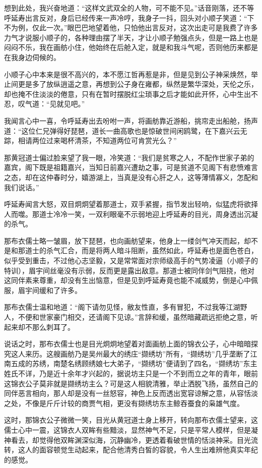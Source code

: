 想到此处，我兴奋地道：“这样文武双全的人物，可不能不见。”话音刚落，还不等呼延寿出言反对，身后已经传来一声冷哼，我身子一抖，回头对小顺子笑道：“下不为例，仅此一次。”眼巴巴地望着他，只怕他出言反对，这次出走可是我费了许多力气才说服小顺子的，各种理由摆了半天，才让小顺子勉强点头，但是一路上也是闷闷不乐，我在画舫小住，他始终在后舱入定，就是和我斗气呢，否则他历来都是在我身边伺候的。

小顺子心中本来是很不高兴的，本不愿江哲再惹是非，但是见到公子神采焕然，举止间更是多了放纵逍遥之意，再想到公子身在雍都，纵然是繁华深处，天伦之乐，却也掩不住淡淡的倦意，只有在暂时摆脱红尘琐事之后才能如此开怀，心中生出不忍，叹气道：“见就见吧。”

我闻言心中一喜，令呼延寿出去吩咐一声，将画舫靠近游船，挑帘走出船舱，扬声道：“这位仁兄弹得好琵琶，道长一曲高歌也是惊破世间闲鸥鹭，在下嘉兴云无踪，相请两位过来喝杯清茶，不知道两位可肯赏光么？”

那黄冠道士偏过脸来望了我一眼，冷笑道：“我们是贫寒之人，不配作世家子弟的嘉宾，阁下既是祖籍嘉兴，当知日前嘉兴遭劫之事，可是贫道不见阁下有悲愤难言之态，却在这仲春时分，嬉游湖上，当真是没有心肝之人，这等薄情寡义，怎配和我们说话。”

呼延寿闻言大怒，双目炯炯望着那道士，双手紧握，指节发出轻响，似猛虎将欲择人而噬。那道士冷冷一笑，一双利眼毫不示弱地迎上呼延寿的目光，周身透出沉凝的杀气。

那布衣儒士略一皱眉，放下琵琶，也向画舫望来，他身上一缕剑气冲天而起，却不是和那道士的杀气汇合，而是将两人暗斗阻断，虽然如此，呼延寿也是面色苍白，似乎受到重击，不过他心志坚毅，又是常常面对宗师级高手的气势凌逼（小顺子的特训），眉宇间丝毫没有示弱，反而更是露出敌意。那道士被同伴剑气阻挠，他对这同伴素来尊重，却没有生出恼意，但是见到呼延寿竟也能不减威势，倒是心中佩服，眉宇间缓和了许多。

那布衣儒士温和地道：“阁下请勿见怪，敝友性直，多有冒犯，不过我等江湖野人，不便和世家豪门相交，还请阁下见谅。”言辞和缓，虽然暗藏疏远拒绝之意，听起来却不那么刺耳了。

说话之时，那布衣儒士也是目光炯炯地望着对面画舫上面的锦衣公子，心中暗暗探究这人来历。这艘画舫乃是吴州最大的绣庄“撷绣坊”所有，“撷绣坊”几乎垄断了江南五成的苏绣，南楚名绣顾绣娘七大弟子，“撷绣坊”便请到了四名，“撷绣坊”东主姓氏不详，乃是近十余年才兴起的，据说坊主只是一个不到而立之年的青年，眼前这锦衣公子莫非就是撷绣坊主么？可是这人相貌清雅，举止洒脱飞扬，虽然自己的同伴恶言相向，那人却是没有一丝怒容，神色上反而透出宽容谅解之意，从容恬淡之处，不像是斤斤计较的商贾气相，更没有撷绣坊东主鲸吞蚕食的枭雄气度。

这时，那锦衣公子微微一笑，目光从黄冠道士身上移开，转向那布衣儒士望来，这儒士心中一震，这锦衣人双眸有些黯淡，显然神气不足，只是平常人模样，但是凝神看去，却觉得他双眸渊深似海，沉静幽冷，更透着看破世情的恬淡神采。目光流转，这人的面容顿觉生动起来，配合他清秀白皙的容貌，令人生出难辨他真实年纪的感觉。

